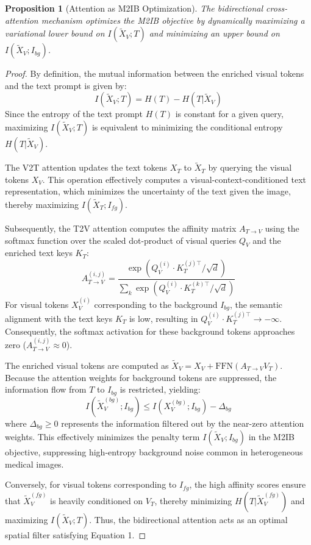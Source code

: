 \documentclass[onecolumn]{IEEEtran}
\numberwithin{equation}{section}
\newtheorem{proposition}[theorem]{Proposition}
\theoremstyle{definition}
\theoremstyle{remark}
\begin{document}
\begin{proposition}[Attention as M2IB Optimization]
\label{prop:attention_m2ib}
The bidirectional cross-attention mechanism optimizes the M2IB objective by dynamically maximizing a variational lower bound on $I(\tilde{X}_V; T)$ and minimizing an upper bound on $I(\tilde{X}_V; I_{bg})$.
\end{proposition}

\begin{proof}
By definition, the mutual information between the enriched visual tokens and the text prompt is given by:
\begin{equation}
    I(\tilde{X}_V; T) = H(T) - H(T | \tilde{X}_V)
\end{equation}
Since the entropy of the text prompt $H(T)$ is constant for a given query, maximizing $I(\tilde{X}_V; T)$ is equivalent to minimizing the conditional entropy $H(T | \tilde{X}_V)$. 

The V2T attention updates the text tokens $X_T$ to $\tilde{X}_T$ by querying the visual tokens $X_V$. This operation effectively computes a visual-context-conditioned text representation, which minimizes the uncertainty of the text given the image, thereby maximizing $I(\tilde{X}_T; I_{fg})$. 

Subsequently, the T2V attention computes the affinity matrix $A_{T \to V}$ using the softmax function over the scaled dot-product of visual queries $Q_V$ and the enriched text keys $K_T$:
\begin{equation}
    A_{T \to V}^{(i, j)} = \frac{\exp(Q_{V}^{(i)} \cdot K_{T}^{(j)\top} / \sqrt{d})}{\sum_{k} \exp(Q_{V}^{(i)} \cdot K_{T}^{(k)\top} / \sqrt{d})}
\end{equation}
For visual tokens $X_V^{(i)}$ corresponding to the background $I_{bg}$, the semantic alignment with the text keys $K_T$ is low, resulting in $Q_{V}^{(i)} \cdot K_{T}^{(j)\top} \to -\infty$. Consequently, the softmax activation for these background tokens approaches zero ($A_{T \to V}^{(i, j)} \approx 0$). 

The enriched visual tokens are computed as $\tilde{X}_V = X_V + \text{FFN}(A_{T \to V} V_T)$. Because the attention weights for background tokens are suppressed, the information flow from $T$ to $I_{bg}$ is restricted, yielding:
\begin{equation}
    I(\tilde{X}_V^{(bg)}; I_{bg}) \le I(X_V^{(bg)}; I_{bg}) - \Delta_{bg}
\end{equation}
where $\Delta_{bg} \ge 0$ represents the information filtered out by the near-zero attention weights. This effectively minimizes the penalty term $I(\tilde{X}_V; I_{bg})$ in the M2IB objective, suppressing high-entropy background noise common in heterogeneous medical images.

Conversely, for visual tokens corresponding to $I_{fg}$, the high affinity scores ensure that $\tilde{X}_V^{(fg)}$ is heavily conditioned on $V_T$, thereby minimizing $H(T | \tilde{X}_V^{(fg)})$ and maximizing $I(\tilde{X}_V; T)$. Thus, the bidirectional attention acts as an optimal spatial filter satisfying Equation 1.
\end{proof}
\end{document}
